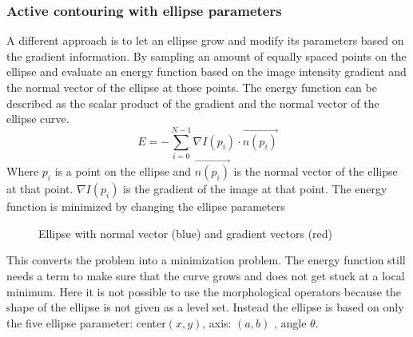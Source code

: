 \newpage
\subsubsection{Active contouring with ellipse parameters}
A different approach is to let an ellipse grow and modify its parameters based on the gradient information. By sampling an amount of equally spaced points on the ellipse and evaluate an energy function based on the image intensity gradient and the normal vector of the ellipse at those points. The energy function can be described as the scalar product of the gradient and the normal vector of the ellipse curve. 
\begin{equation}
    E = -\sum_{i=0}^{N-1} \nabla I(p_i) \cdot \vec{n(p_i)}
\end{equation} 
Where $p_i$ is a point on the ellipse and $\vec{n(p_i)}$ is the normal vector of the ellipse at that point. $\nabla I(p_i)$ is the gradient of the image at that point. The energy function is minimized by changing the ellipse parameters
\begin{figure}[h]
    \centering
    \label{fig:normalgradientellipse}
    \caption{Ellipse with normal vector (blue) and gradient vectors (red)}
    
    \end{figure}
This converts the problem into a minimization problem. The energy function still needs a term to make sure that the curve grows and does not get stuck at a local minimum. Here it is not possible to use the morphological operators because the shape of the ellipse is not given as a level set. Instead the ellipse is based on only the five ellipse parameter: center$(x,y)$, axis: $(a,b)$ , angle $\theta$. 

